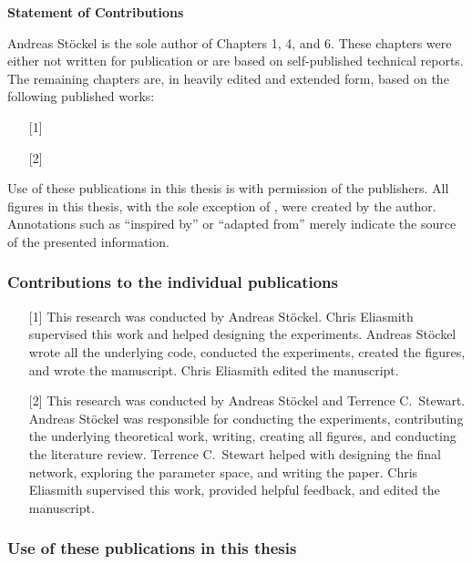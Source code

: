 \begin{center}\textbf{Statement of Contributions}\end{center}

Andreas Stöckel is the sole author of Chapters 1, 4, and 6.
These chapters were either not written for publication or are based on self-published technical reports.
The remaining chapters are, in heavily edited and extended form, based on the following published works:

\begin{enumerate}
	\item[{[1]}] 
	\item[{[2]}] 
\end{enumerate}

\noindent Use of these publications in this thesis is with permission of the publishers.
All figures in this thesis, with the sole exception of , were created by the author.
Annotations such as \enquote{inspired by} or \enquote{adapted from} merely indicate the source of the presented information.

\subsubsection{Contributions to the individual publications}

\begin{enumerate}
	\item[{[1]}] This research was conducted by Andreas Stöckel.
	Chris Eliasmith supervised this work and helped designing the experiments.
	Andreas Stöckel wrote all the underlying code, conducted the experiments, created the figures, and wrote the manuscript.
	Chris Eliasmith edited the manuscript.
	\item[{[2]}] This research was conducted by Andreas Stöckel and Terrence C.~Stewart.
	Andreas Stöckel was responsible for conducting the experiments, contributing the underlying theoretical work, writing, creating all figures, and conducting the literature review.
	Terrence C.~Stewart helped with designing the final network, exploring the parameter space, and writing the paper.
	Chris Eliasmith supervised this work, provided helpful feedback, and edited the manuscript.
\end{enumerate}

\subsubsection{Use of these publications in this thesis}

